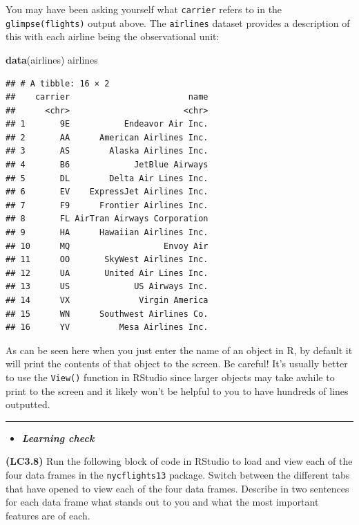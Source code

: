 \documentclass[]{tufte-book}
\newenvironment{Shaded}{\begin{snugshade}}{\end{snugshade}}
\newcommand{\KeywordTok}[1]{\textcolor[rgb]{0.13,0.29,0.53}{\textbf{{#1}}}}
\newcommand{\NormalTok}[1]{{#1}}
\let\oldrule=\rule
\renewcommand{\rule}[1]{\oldrule{\linewidth}}
\newenvironment{rmdblock}[1]
  {\begin{shaded*}
  \begin{itemize}
  \renewcommand{\labelitemi}{
    \raisebox{-.7\height}[0pt][0pt]{
    }
  }
  \item
  }
  {
  \end{itemize}
  \end{shaded*}
  }
\newenvironment{learncheck}
  {\begin{rmdblock}{warning}}
  {\end{rmdblock}}
\begin{document}
You may have been asking yourself what \texttt{carrier} refers to in the
\texttt{glimpse(flights)} output above. The \texttt{airlines} dataset
provides a description of this with each airline being the observational
unit:

\begin{Shaded}
\begin{Highlighting}[]
\KeywordTok{data}\NormalTok{(airlines)}
\NormalTok{airlines}
\end{Highlighting}
\end{Shaded}

\begin{verbatim}
## # A tibble: 16 × 2
##    carrier                        name
##      <chr>                       <chr>
## 1       9E           Endeavor Air Inc.
## 2       AA      American Airlines Inc.
## 3       AS        Alaska Airlines Inc.
## 4       B6             JetBlue Airways
## 5       DL        Delta Air Lines Inc.
## 6       EV    ExpressJet Airlines Inc.
## 7       F9      Frontier Airlines Inc.
## 8       FL AirTran Airways Corporation
## 9       HA      Hawaiian Airlines Inc.
## 10      MQ                   Envoy Air
## 11      OO       SkyWest Airlines Inc.
## 12      UA       United Air Lines Inc.
## 13      US             US Airways Inc.
## 14      VX              Virgin America
## 15      WN      Southwest Airlines Co.
## 16      YV          Mesa Airlines Inc.
\end{verbatim}

As can be seen here when you just enter the name of an object in R, by
default it will print the contents of that object to the screen. Be
careful! It's usually better to use the \texttt{View()} function in
RStudio since larger objects may take awhile to print to the screen and
it likely won't be helpful to you to have hundreds of lines outputted.

\begin{center}\rule{0.5\linewidth}{\linethickness}\end{center}

\begin{learncheck}
\textbf{\emph{Learning check}}
\end{learncheck}

\textbf{(LC3.8)} Run the following block of code in RStudio to load and
view each of the four data frames in the \texttt{nycflights13} package.
Switch between the different tabs that have opened to view each of the
four data frames. Describe in two sentences for each data frame what
stands out to you and what the most important features are of each.
\end{document}
